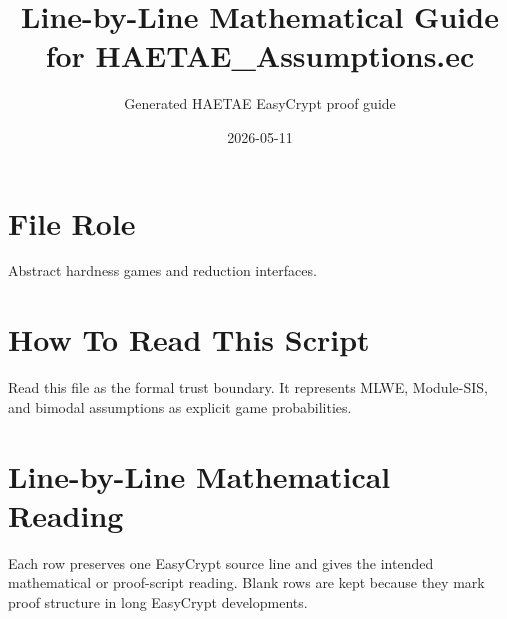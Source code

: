\documentclass[10pt]{article}
\title{Line-by-Line Mathematical Guide for HAETAE\_Assumptions.ec}
\author{Generated HAETAE EasyCrypt proof guide}
\date{2026-05-11}
\begin{document}
\maketitle

\section*{File Role}
Abstract hardness games and reduction interfaces.

\section*{How To Read This Script}
Read this file as the formal trust boundary.  It represents MLWE, Module-SIS, and bimodal assumptions as explicit game probabilities.

\section*{Line-by-Line Mathematical Reading}
Each row preserves one EasyCrypt source line and gives the intended mathematical
or proof-script reading.  Blank rows are kept because they mark proof structure
in long EasyCrypt developments.
\end{document}
